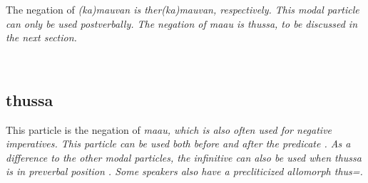 The negation of \em (ka)mauvan \em is \em ther(ka)mauvan\em, respectively. This modal particle can only be used postverbally. The negation of \em maau \em is \em thussa\em, to be discussed in the next section.

\\
%
%


\subsection{thussa}\label{sec:wc:thussa}
This particle is the negation of \em maau\em, which is also often used for negative imperatives. This particle can be used  both before   and after the predicate  . As a difference to the other modal particles, the infinitive can also be used when \em thussa \em is in preverbal position . Some speakers also have a precliticized allomorph \em thus=\em.


\\


%


\\

